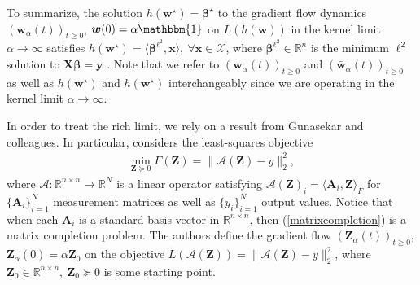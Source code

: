 \documentclass{article}
\begin{document}
To summarize, the solution $\bar{h}(\boldsymbol{w}^{\star}) = \boldsymbol{\beta}^{\star}$ to the gradient flow dynamics $(\boldsymbol{w}_{\alpha}(t))_{t \geq 0}$, $\boldsymbol{w}(0) = \alpha \mathbbm{1}$ on $L(h(\boldsymbol{w}))$ in the kernel limit $\alpha \rightarrow \infty$ satisfies $h(\boldsymbol{w}^{\star}) =\langle \boldsymbol{\beta}^{\ell^2}, \boldsymbol{x} \rangle, \ \forall \boldsymbol{x} \in \mathcal{X}$, where $\boldsymbol{\beta}^{\ell^2} \in \mathbb{R}^n$ is the minimum $\ell^2$ solution to $\boldsymbol{X} \boldsymbol{\beta} = \boldsymbol{y}$ \cite{woodworth2020kernel}. Note that we refer to $(\boldsymbol{w}_{\alpha}(t))_{t \geq 0}$ and $(\boldsymbol{\bar{w}}_{\alpha}(t))_{t \geq 0}$ as well as $h(\boldsymbol{w}^{\star})$ and $\bar{h}(\boldsymbol{w}^{\star})$ interchangeably since we are operating in the kernel limit $\alpha \rightarrow \infty$.

In order to treat the rich limit, we rely on a result from Gunasekar and colleagues. In particular, \cite{gunasekar2018implicit} considers the least-squares objective
\begin{align}\label{matrixcompletion}
    \min_{\boldsymbol{Z} \succeq 0} F(\boldsymbol{Z}) = \| \mathcal{A}(\boldsymbol{Z}) - y \|_2^2,
\end{align}
where $\mathcal{A}: \mathbb{R}^{n \times n} \rightarrow \mathbb{R}^N$ is a linear operator satisfying $\mathcal{A}(\boldsymbol{Z})_i = \langle \boldsymbol{A}_i, \boldsymbol{Z} \rangle_F$ for $\{ \boldsymbol{A}_i \}_{i=1}^N$ measurement matrices as well as $\{ y_i \}_{i=1}^N$ output values. Notice that when each $\boldsymbol{A}_i$ is a standard basis vector in $\mathbb{R}^{n \times n}$, then (\ref{matrixcompletion}) is a matrix completion problem. The authors define the gradient flow $(\boldsymbol{Z}_{\alpha}(t))_{t \geq 0}$, $\boldsymbol{Z}_{\alpha}(0) = \alpha \boldsymbol{Z}_0$ on the objective $\tilde{L}(\mathcal{A}(\boldsymbol{Z})) = \| \mathcal{A}(\boldsymbol{Z}) - y \|_2^2$, where $\boldsymbol{Z}_0 \in \mathbb{R}^{n \times n}, \ \boldsymbol{Z}_0 \succeq 0$ is some starting point. 
\end{document}
